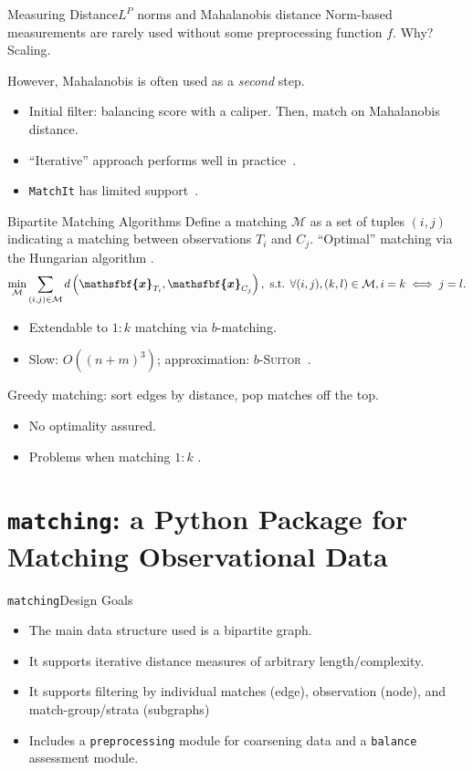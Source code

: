\documentclass[11pt, compress]{beamer}
\renewcommand{\vec}[1]{\ensuremath{\boldsymbol{\mathsfbf{#1}}}}
\newcommand{\set}[1]{\ensuremath{\mathcal{#1}}}
\begin{document}
\begin{frame}{Measuring Distance}{$L^P$ norms and Mahalanobis distance}
	Norm-based measurements are rarely used without some preprocessing function $f$.
	Why? Scaling.

	However, Mahalanobis is often used as a \emph{second} step.
	\begin{itemize}
		\item Initial filter: balancing score with a caliper. Then, match on Mahalanobis distance.
		\item ``Iterative'' approach performs well in practice~\parencite{baltar_mahalanobis_2014}. 
		\item \texttt{MatchIt} has limited support~\parencite{ho_matchit_2011}.
	\end{itemize}
\end{frame}


\begin{frame}{Bipartite Matching Algorithms}{}
	Define a matching $\set{M}$ as a set of tuples $(i, j)$ indicating a matching between observations $T_i$ and $C_j$. 
	``Optimal'' matching via the Hungarian algorithm \parencite{munkres_algorithms_1957}.
	\begin{equation}
		\min _{\mathcal{M}} \sum_{(i, j) \in \mathcal{M}} d\left(\vec{x}_{T_{i}}, \vec{x}_{C_{j}}\right), \text { s.t. } \forall(i, j),(k, l) \in \mathcal{M}, i=k \iff j=l.
	\end{equation}
	\begin{itemize}
		\item Extendable to $1:k$ matching via $b$-matching.
		\item Slow: $O((n + m)^3)$; approximation: $b$-\textsc{Suitor}~\parencite{khan_efficient_2016}.
	\end{itemize}

	Greedy matching: sort edges by distance, pop matches off the top.
	\begin{itemize}
		\item No optimality assured.
		\item Problems when matching $1:k$ \parencite{rosenbaum_optimal_1989}.
	\end{itemize}
\end{frame}


\section{\texttt{matching}: a Python Package for Matching Observational Data}
\begin{frame}{\texttt{matching}}{Design Goals}
	\begin{itemize}
		\item The main data structure used is a bipartite graph.
		\item It supports iterative distance measures of arbitrary length/complexity.
		\item It supports filtering by individual matches (edge), observation (node), and match-group/strata (subgraphs)
		\item Includes a \texttt{preprocessing} module for coarsening data and a \texttt{balance} assessment module.
	\end{itemize}
\end{frame}
\end{document}
